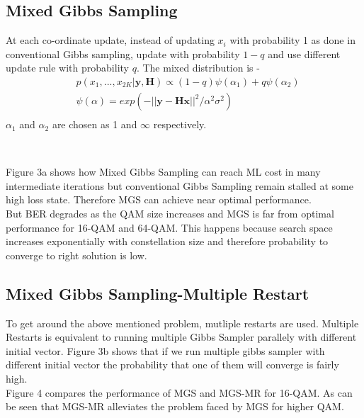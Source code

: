 \documentclass{article}
\begin{document}
\subsection*{Mixed Gibbs Sampling}
At each co-ordinate update, instead of updating $x_i$ with probability 1 
as done in conventional Gibbs sampling, update with probability $1-q$ and
use different update rule with probability $q$. The mixed distribution is -
\begin{equation*}
\begin{split}
    &p(x_1,...,x_{2K}|\mathbf{y},\mathbf{H}) \propto (1-q)\psi(\alpha_1) + q\psi(\alpha_2)\\
    &\psi(\alpha) = exp({ -||\mathbf{y - Hx}|| }^2/\alpha^2\sigma^2)\\
\end{split}
\end{equation*}
$\alpha_1$ and $\alpha_2$ are chosen as 1 and $\infty$ respectively.

\begin{figure}[h]
\centering
{}~
%
\caption{}
\end{figure}

Figure 3a shows how Mixed Gibbs Sampling can reach ML cost in many intermediate
iterations but conventional Gibbs Sampling remain stalled at some high loss state.
Therefore MGS can achieve near optimal performance. \\
But BER degrades as the QAM size increases and MGS is far from optimal performance 
for 16-QAM and 64-QAM. This happens because search space increases exponentially with
constellation size and therefore probability to converge to right solution is low.

\subsection*{Mixed Gibbs Sampling-Multiple Restart}
To get around the above mentioned problem, mutliple restarts are used. Multiple
Restarts is equivalent to running multiple Gibbs Sampler parallely with different
initial vector. Figure 3b shows that if we run multiple gibbs sampler with different
initial vector the probability that one of them will converge is fairly high.\\
Figure 4 compares the performance of MGS and MGS-MR for 16-QAM. As can be seen that
MGS-MR alleviates the problem faced by MGS for higher QAM.\\
\begin{figure}[h]
\centering
{}~
%
\caption{}
\end{figure}
\end{document}
